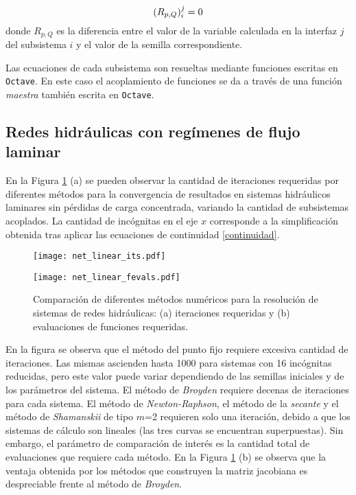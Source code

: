 \begin{equation}
(R_{p,Q})_{i}^{j}=0 \\
\end{equation}
donde $R_{p,Q}$ es la diferencia entre el valor de la variable calculada en la interfaz $j$ del subsistema $i$ y el valor de la semilla correspondiente.

Las ecuaciones de cada subsistema son resueltas mediante funciones escritas en \texttt{Octave}.
En este caso el acoplamiento de funciones se da a través de una función \textit{maestra} también escrita en \texttt{Octave}.

\subsection*{Redes hidráulicas con regímenes de flujo laminar}
\label{laminar}

En la Figura \ref{net_linear} (a) se pueden observar la cantidad de iteraciones requeridas por diferentes métodos para la convergencia de resultados
en sistemas hidráulicos laminares sin pérdidas de carga concentrada,
variando la cantidad de subsistemas acoplados.
La cantidad de incógnitas en el eje $x$ corresponde a la simplificación obtenida tras aplicar las ecuaciones de continuidad \ref{continuidad}.

\begin{figure}[ht]
	\begin{minipage}{0.5\linewidth}
		\centering
		\texttt{[image: net\_linear\_its.pdf]}
	\end{minipage}
	\begin{minipage}{0.5\linewidth}
		\centering
		\texttt{[image: net\_linear\_fevals.pdf]}
	\end{minipage}
	\caption[Comparación de diferentes métodos numéricos para la resolución de sistemas de redes hidráulicas]
  {Comparación de diferentes métodos numéricos para la resolución de sistemas de redes hidráulicas:
  (a) iteraciones requeridas y (b) evaluaciones de funciones requeridas.}
  \label{net_linear}
\end{figure}

En la figura se observa que el método del punto fijo requiere excesiva cantidad de iteraciones.
Las mismas ascienden hasta 1000 para sistemas con 16 incógnitas reducidas,
pero este valor puede variar dependiendo de las semillas iniciales y de los parámetros del sistema.
El método de \textit{Broyden} requiere decenas de iteraciones para cada sistema.
El método de \textit{Newton-Raphson}, el método de la \textit{secante}
y el método de \textit{Shamanskii} de tipo $m$=2
requieren solo una iteración, debido a que los sistemas de cálculo son lineales
(las tres curvas se encuentran superpuestas).
Sin embargo, el parámetro de comparación de interés es la cantidad total de evaluaciones que requiere cada método.
En la Figura \ref{net_linear} (b) se observa que la ventaja obtenida por los métodos que construyen la matriz jacobiana es despreciable frente al método de \textit{Broyden}.

